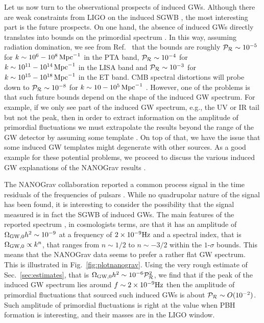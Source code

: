 \documentclass[a4paper,11pt]{article}
\numberwithin{equation}{section}
\begin{document}
Let us now turn to the observational prospects of induced GWs. Although there are weak constraints from LIGO \cite{LIGOScientific:2019vic} on the induced SGWB \cite{Kapadia:2020pnr,Wang:2016ana,Romero-Rodriguez:2021aws}, the most interesting part is the future prospects. On one hand, the absence of induced GWs directly translates into bounds on the primordial spectrum \cite{Gow:2020bzo}. In this way, assuming radiation domination, we see from Ref.~\cite{Gow:2020bzo} that the bounds are roughly ${\cal P}_{\cal R}\sim 10^{-5}$ for $k\sim 10^6-10^8\,{\rm Mpc}^{-1}$ in the PTA band, ${\cal P}_{\cal R}\sim 10^{-4}$ for $k\sim 10^{11}-10^{14}\,{\rm Mpc}^{-1}$ in the LISA band and ${\cal P}_{\cal R}\sim 10^{-3}$ for $k\sim 10^{15}-10^{18}\,{\rm Mpc}^{-1}$ in the ET band. CMB spectral distortions will probe down to ${\cal P}_{\cal R}\sim 10^{-8}$ for $k\sim 10-10^{5}\,{\rm Mpc}^{-1}$ \cite{Kite:2020uix,Unal:2020mts}. However, one of the problems is that such future bounds depend on the shape of the induced GW spectrum. For example, if we only see part of the induced GW spectrum, e.g., the UV or IR tail but not the peak, then in order to extract information on the amplitude of primordial fluctuations we must extrapolate the results beyond the range of the GW detector by assuming some template \cite{Kuroyanagi:2018csn}. On top of that, we have the issue that some induced GW templates might degenerate with other sources. As a good example for these potential problems, we proceed to discuss the various induced GW explanations of the NANOGrav results \cite{Arzoumanian:2020vkk}.

The NANOGrav collaboration reported a common process signal in the time residuals of the frequencies of pulsars \cite{Arzoumanian:2020vkk}. While no quadrupolar nature of the signal has been found, it is interesting to consider the possibility that the signal measured is in fact the SGWB of induced GWs. The main features of the reported spectrum \cite{Arzoumanian:2020vkk}, in cosmologists terms, are that it has an amplitude of $\Omega_{\rm GW,0}h^2\sim 10^{-9}$ at a frequency of $2\times 10^{-9}{\rm Hz}$ and a spectral index, that is  $\Omega_{\rm GW,0}\propto k^{n}$, that ranges from $n\sim 1/2$ to $n\sim -3/2$ within the $1$-$\sigma$ bounds. This means that the NANOGrav data seems to prefer a rather flat GW spectrum. This is illustrated in Fig.~\ref{fig:plotnanograv}. Using the very rough estimate of Sec.~\ref{sec:estimates}, that is $\Omega_{\rm GW,0}h^2\sim 10^{-6}{\cal P}_{\cal R}^2$, we find that if the peak of the induced GW spectrum lies around $f\sim2\times 10^{-9}{\rm Hz}$ then the amplitude of primordial fluctuations that sourced such induced GWs is about ${\cal P}_{\cal R}\sim O(10^{-2})$. Such amplitude of primordial fluctuations is right at the value when PBH formation is interesting, and their masses are in the LIGO window. 
\end{document}
